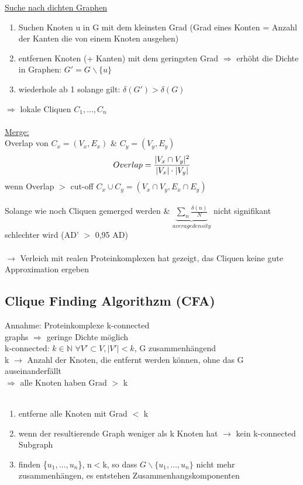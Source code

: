\underline{Suche nach dichten Graphen}
\begin{enumerate}
	\item Suchen Knoten u in G mit dem kleinsten Grad (Grad eines Konten = Anzahl der Kanten die von einem Knoten ausgehen)
	\item entfernen Knoten (+ Kanten) mit dem geringsten Grad $\Rightarrow$ erhöht die Dichte in Graphen: $G'=G\backslash\{u\}$
	\item wiederhole ab 1 solange gilt: $\delta(G') > \delta(G)$
\end{enumerate}

$\Rightarrow$ lokale Cliquen $C_{1},…,C_{n}$\\\\
\underline{Merge:}\\
Overlap von $C_{x}=(V_{x},E_{x})$ \& $C_{y}=(V_{y},E_{y})$\\
\begin{equation}
Overlap={|V_{x} \cap V_{y}|^2 \over |V_{x}| \cdot |V_{y}|}
\end{equation}
wenn Overlap $>$ cut-off $C_{x} \cup C_{y}= (V_{x} \cap V_{y}, E_{x} \cap E_{y})$\\\\
Solange wie noch Cliquen gemerged werden \& $\underbrace{\sum \limits_{n} \frac{\delta(n)}{N}}_{average density}$ nicht signifikant schlechter wird (AD' $>$ 0,95 AD)\\\\
$\rightarrow$ Verleich mit realen Proteinkomplexen hat gezeigt, das Cliquen keine gute Approximation ergeben

\subsection{Clique Finding Algorithzm (CFA)}
Annahme: Proteinkomplexe k-connected\\
graphs $\Rightarrow$ geringe Dichte möglich\\
k-connected: $k \in \mathbb{N}$ $\forall V' \subset V, |V'| < k$, G zusammenhängend\\
k $\rightarrow$ Anzahl der Knoten, die entfernt werden können, ohne das G auseinanderfällt\\
$\Rightarrow$ alle Knoten haben Grad $>$ k
\\\\
\begin{enumerate}
	\item entferne alle Knoten mit Grad $<$ k
	\item wenn der resultierende Graph weniger als k Knoten hat $\rightarrow$ kein k-connected Subgraph
	\item finden \{$u_{1},…,u_{n}$\}, n$<$k, so dass $G\backslash \{u_{1},…,u_{n}\}$ nicht mehr zusammenhängen, es entstehen Zusammenhangskomponenten
\end{enumerate}

